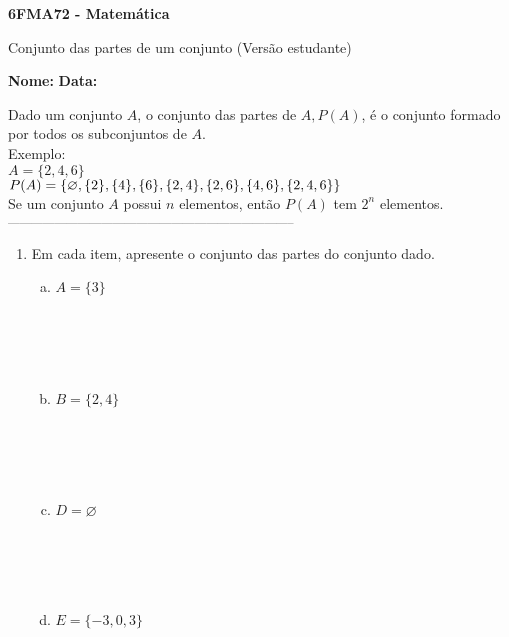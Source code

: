 \documentclass[a4paper,14pt]{article}
\begin{document}
	
	\noindent\textbf{6FMA72 - Matemática} 
	
	\begin{center}Conjunto das partes de um conjunto (Versão estudante)
	\end{center}
	
	\noindent\textbf{Nome:} \underline{\hspace{10cm}}
	\noindent\textbf{Data:} \underline{\hspace{4cm}}
	
	
	\begin{multicols}{2}
		\noindent Dado um conjunto $A$, o conjunto das partes de $A, P(A)$, é o conjunto formado por todos os subconjuntos de $A$. \\
		Exemplo: \\
		$A = \{2, 4, 6\}$ \\
		$P(A) = \{\varnothing, \{2\}, \{4\}, \{6\}, \{2, 4\}, \{2, 6\}, \\ \{4, 6\}, \{2, 4, 6\}\}$ \\
		Se um conjunto $A$ possui $n$ elementos, então $P(A)$ tem $2^{n}$ elementos. \\
		\noindent\textsubscript{--------------------------------------------------------------------------}
    	\begin{enumerate}
   			\item Em cada item, apresente o conjunto das partes do conjunto dado.
   			\begin{enumerate}[a)]
   				\item $A = \{3\}$ \\\\\\\\\\
   				\item $B = \{2, 4\}$ \\\\\\\\\\
   				\item $D = \varnothing$ \\\\\\\\\\
   				\item $E = \{-3, 0, 3\}$ \\\\\\\\\\

\end{enumerate}
\end{enumerate}
\end{multicols}
\end{document}
